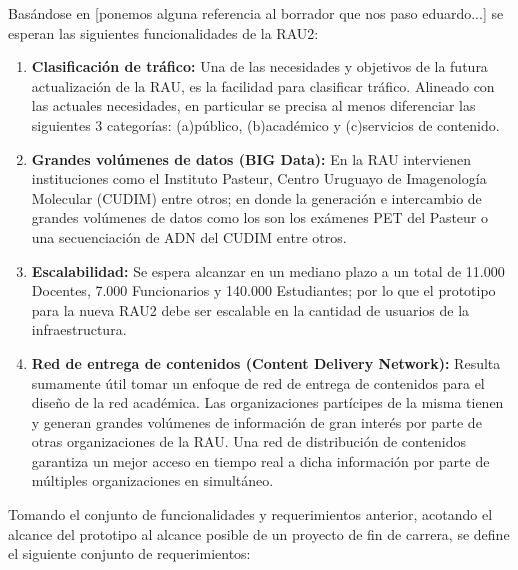 Basándose en [ponemos alguna referencia al borrador que nos paso eduardo...] se esperan las siguientes funcionalidades de la RAU2:

\begin{enumerate}
\item \textbf{Clasificación de tráfico:} Una de las necesidades y objetivos de la futura actualizaci\'on de la RAU, es la facilidad para clasificar tráfico. Alineado con las actuales necesidades, en particular se precisa al menos diferenciar las siguientes 3 categorías: (a)público, (b)académico y (c)servicios de contenido.

\item \textbf{Grandes volúmenes de datos (BIG Data):} En la RAU intervienen instituciones como el Instituto Pasteur, Centro Uruguayo de Imagenología Molecular (CUDIM) entre otros; en donde la generación e intercambio de grandes volúmenes de datos como los son los exámenes PET del Pasteur o una secuenciación de ADN del CUDIM entre otros.

\item \textbf{Escalabilidad:} Se espera alcanzar en un mediano plazo a un total de 11.000 Docentes, 7.000 Funcionarios y 140.000 Estudiantes; por lo que el prototipo para la nueva RAU2 debe ser escalable en la cantidad de usuarios de la infraestructura.

\item \textbf{Red de entrega de contenidos (Content Delivery Network):} Resulta sumamente útil tomar un enfoque de red de entrega de contenidos para el diseño de la red académica. Las organizaciones partícipes de la misma tienen y generan grandes volúmenes de información de gran interés por parte de otras organizaciones de la RAU. Una red de distribución de contenidos garantiza un mejor acceso en tiempo real a dicha información por parte de múltiples organizaciones en simultáneo. 
 
\end{enumerate}

Tomando el conjunto de funcionalidades y requerimientos anterior, acotando el alcance del prototipo al alcance posible de un proyecto de fin de carrera, se define el siguiente conjunto de requerimientos:

